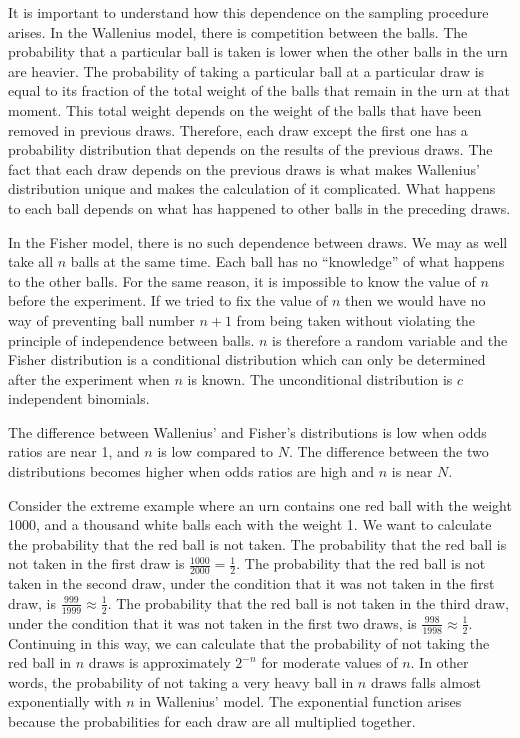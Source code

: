 \documentclass[a4paper]{article}
\begin{document}
It is important to understand how this dependence on the sampling procedure
arises. In the Wallenius model, there is competition between the balls.
The probability that a particular ball is taken is lower when the other 
balls in the urn are heavier. The probability of taking a particular ball
at a particular draw is equal to its fraction of the total weight of the
balls that remain in the urn at that moment. This total weight 
depends on the weight of
the balls that have been removed in previous draws. Therefore, each draw
except the first one has a probability distribution that depends on the
results of the previous draws. The fact that each draw depends on the 
previous draws is what makes Wallenius' distribution unique and makes the
calculation of it complicated. What happens to each ball depends on what
has happened to other balls in the preceding draws.

In the Fisher model, there is no such dependence between draws. We may 
as well take all $n$ balls at the same time. Each ball
has no ``knowledge'' of what happens to the other balls. For the same 
reason, it is impossible to know the value of $n$ before the experiment.
If we tried to fix the value of $n$ then we would have no way of 
preventing ball number $n+1$ from being taken without violating the principle
of independence between balls. $n$ is therefore a random variable and
the Fisher distribution is a conditional distribution which can only
be determined after the experiment when $n$ is known. The unconditional
distribution is $c$ independent binomials.

The difference between Wallenius' and Fisher's distributions is low 
when odds ratios are
near 1, and $n$ is low compared to $N$. The difference between the two 
distributions becomes higher when odds ratios are high and $n$ is near $N$.

Consider the extreme example where an urn contains one red ball with the
weight 1000, and a thousand white balls each with the weight 1. 
We want to calculate the probability that the red ball is not taken.
The probability that the red ball is not taken in the first draw is 
$\frac{1000}{2000} = \frac 12$. The probability that the red ball is
not taken in the second draw, under the condition that it was not taken
in the first draw, is $\frac{999}{1999} \approx \frac 12$.  
The probability that the red ball is
not taken in the third draw, under the condition that it was not taken
in the first two draws, is $\frac{998}{1998} \approx \frac 12$.  
Continuing in this way, we can calculate that the probability of not
taking the red ball in $n$ draws is approximately $2^{-n}$ for moderate
values of $n$.  
In other words, the probability of not taking a very heavy ball in $n$ 
draws falls almost exponentially with $n$ in Wallenius' model.
The exponential function arises because the probabilities for each draw
are all multiplied together.
\end{document}

